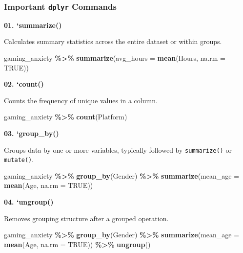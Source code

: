 \documentclass[
]{book}
\newenvironment{Shaded}{\begin{snugshade}}{\end{snugshade}}
\newcommand{\AttributeTok}[1]{\textcolor[rgb]{0.13,0.29,0.53}{#1}}
\newcommand{\ConstantTok}[1]{\textcolor[rgb]{0.56,0.35,0.01}{#1}}
\newcommand{\FunctionTok}[1]{\textcolor[rgb]{0.13,0.29,0.53}{\textbf{#1}}}
\newcommand{\NormalTok}[1]{#1}
\newcommand{\SpecialCharTok}[1]{\textcolor[rgb]{0.81,0.36,0.00}{\textbf{#1}}}
\begin{document}
\subsubsection*{\texorpdfstring{Important \texttt{dplyr} Commands}{Important dplyr Commands}}\label{important-dplyr-commands}

\textbf{01. `summarize()}

Calculates summary statistics across the entire dataset or within groups.

\begin{Shaded}
\begin{Highlighting}[]
\NormalTok{gaming\_anxiety }\SpecialCharTok{\%\textgreater{}\%}
  \FunctionTok{summarize}\NormalTok{(}\AttributeTok{avg\_hours =} \FunctionTok{mean}\NormalTok{(Hours, }\AttributeTok{na.rm =} \ConstantTok{TRUE}\NormalTok{))}
\end{Highlighting}
\end{Shaded}

\textbf{02. `count()}

Counts the frequency of unique values in a column.

\begin{Shaded}
\begin{Highlighting}[]
\NormalTok{gaming\_anxiety }\SpecialCharTok{\%\textgreater{}\%}
  \FunctionTok{count}\NormalTok{(Platform)}
\end{Highlighting}
\end{Shaded}

\textbf{03. `group\_by()}

Groups data by one or more variables, typically followed by \texttt{summarize()} or \texttt{mutate()}.

\begin{Shaded}
\begin{Highlighting}[]
\NormalTok{gaming\_anxiety }\SpecialCharTok{\%\textgreater{}\%}
  \FunctionTok{group\_by}\NormalTok{(Gender) }\SpecialCharTok{\%\textgreater{}\%}
  \FunctionTok{summarize}\NormalTok{(}\AttributeTok{mean\_age =} \FunctionTok{mean}\NormalTok{(Age, }\AttributeTok{na.rm =} \ConstantTok{TRUE}\NormalTok{))}
\end{Highlighting}
\end{Shaded}

\textbf{04. `ungroup()}

Removes grouping structure after a grouped operation.

\begin{Shaded}
\begin{Highlighting}[]
\NormalTok{gaming\_anxiety }\SpecialCharTok{\%\textgreater{}\%}
  \FunctionTok{group\_by}\NormalTok{(Gender) }\SpecialCharTok{\%\textgreater{}\%}
  \FunctionTok{summarize}\NormalTok{(}\AttributeTok{mean\_age =} \FunctionTok{mean}\NormalTok{(Age, }\AttributeTok{na.rm =} \ConstantTok{TRUE}\NormalTok{)) }\SpecialCharTok{\%\textgreater{}\%}
  \FunctionTok{ungroup}\NormalTok{()}
\end{Highlighting}
\end{Shaded}
\end{document}
